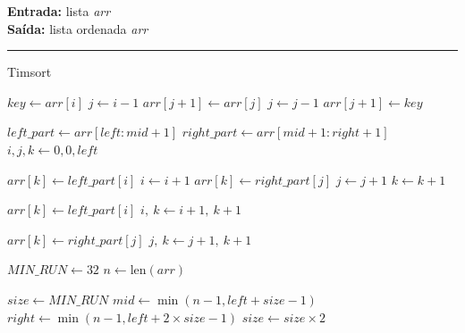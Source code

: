 \documentclass[conference]{IEEEtran}
\begin{document}
\begin{algorithm}[H]
    \raggedright
    \vspace{.1em}
    \textbf{Entrada:} lista \textit{arr} \\
    \textbf{Saída:} lista ordenada \textit{arr} \\
    \vspace{.5em}
    \hrule 
    \caption{Timsort}
    \begin{algorithmic}[1]
                \State $key \gets arr[i]$
                \State $j \gets i - 1$
                    \State $arr[j + 1] \gets arr[j]$
                    \State $j \gets j - 1$
                \EndWhile
                \State $arr[j + 1] \gets key$
            \EndFor
        \EndFunction
    
            \State $left\_part \gets arr[left : mid + 1]$
            \State $right\_part \gets arr[mid + 1 : right + 1]$
            \State $i, j, k \gets 0, 0, left$
            
                    \State $arr[k] \gets left\_part[i]$
                    \State $i \gets i + 1$
                \Else
                    \State $arr[k] \gets right\_part[j]$
                    \State $j \gets j + 1$
                \EndIf
                \State $k \gets k + 1$
            \EndWhile
    
                \State $arr[k] \gets left\_part[i]$
                \State $i,\ k \gets i + 1,\ k + 1$
            \EndWhile
    
                \State $arr[k] \gets right\_part[j]$
                \State $j,\ k \gets j + 1,\ k + 1$
            \EndWhile
        \EndFunction
    
            \State $MIN\_RUN \gets 32$
            \State $n \gets \text{len}(arr)$
    
                \State {}
            \EndFor
    
            \State $size \gets MIN\_RUN$
                    \State $mid \gets \min(n - 1, left + size - 1)$
                    \State $right \gets \min(n - 1, left + 2 \times size - 1)$
                        \State {}
                    \EndIf
                \EndFor
                \State $size \gets size \times 2$
            \EndWhile
    

\end{algorithmic}
\end{algorithm}
\end{document}
